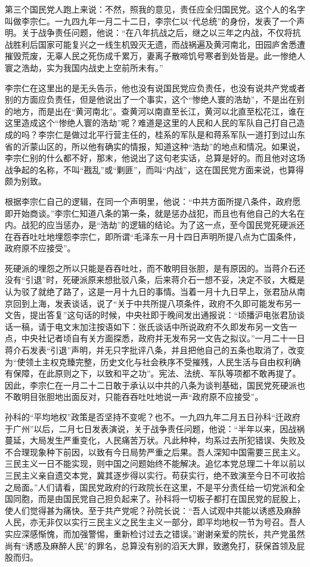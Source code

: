 第三个国民党人跑上来说：不然，照我的意见，责任应全归国民党。这个人的名字叫做李宗仁。一九四九年一月二十二日，李宗仁以“代总统”的身份，发表了一个声明。关于战争责任问题，他说：“在八年抗战之后，继之以三年之内战，不仅将抗战胜利后国家可能复兴之一线生机毁灭无遗，而战祸遍及黄河南北，田园庐舍悉遭摧毁荒废，无辜人民之死伤成千累万，妻离子散啼饥号寒者到处皆是。此一惨绝人寰之浩劫，实为我国内战史上空前所未有。”

李宗仁在这里出的是无头告示，他也没有说国民党应负责任，也没有说共产党或者别的方面应负责任，但是他说出了一个事实，这个“惨绝人寰的浩劫”，不是出在别的地方，而是出在“黄河南北”。查黄河以南直至长江，黄河以北直至松花江，谁在这里造成这个“惨绝人寰的浩劫”呢？难道是这里的人民和人民的军队自己打自己造成的吗？李宗仁是做过北平行营主任的，桂系的军队是和蒋系军队一道打到过山东省的沂蒙山区的，所以他有确实的情报，知道这种“浩劫”的地点和情况。如果说，李宗仁别的什么都不好，那末，他说出了这句老实话，总算是好的。而且他对这场战争起的名称，不叫“戡乱”或“剿匪”，而叫“内战”，这在国民党方面来说，也算得颇为别致。

根据李宗仁自己的逻辑，在同一个声明里，他说：“中共方面所提八条件，政府愿即开始商谈。”李宗仁知道八条的第一条，就是惩办战犯，而且也有他自己的大名在内。战犯的应当惩办，是“浩劫”的逻辑的结论。为了这一点，至今国民党死硬派还在吞吞吐吐地埋怨李宗仁，即所谓“毛泽东一月十四日声明所提八点为亡国条件，政府原不应接受”。

死硬派的埋怨之所以只能是吞吞吐吐，而不敢明目张胆，是有原因的。当蒋介石还没有“引退”时，死硬派原来想批驳八条，后来蒋介石一想不妥，决定不驳，大概是认为驳了就绝了路了，这是一月十九日的事情。当着一月十九日早上，张君劢从南京回到上海，发表谈话，说了“关于中共所提八项条件，政府不久即可能发布另一文告，提出答复”这句话的时候，中央社即于晚间发出通报说：“顷播沪电张君劢谈话一稿，请于电文末加注按语如下：张氏谈话中所说政府不久即发布另一文告一点，中央社记者顷自有关方面探悉，政府并无发布另一文告之拟议。”一月二十一日蒋介石发表“引退”声明，并无只字批评八条，并且把他自己的五条也取消了，改变为“使领土主权克臻完整，历史文化与社会秩序不受摧残，人民生活与自由权利确有保障，在此原则之下，以致和平之功”。宪法、法统、军队等项都不敢再提了。因此，李宗仁在一月二十二日敢于承认以中共的八条为谈判基础，国民党死硬派也不敢明目张胆地出面反对，只能吞吞吐吐地说一声“政府原不应接受”。

孙科的“平均地权”政策是否坚持不变呢？也不。一九四九年二月五日孙科“迁政府于广州”以后，二月七日发表演说，关于战争责任问题，他说：“半年以来，因战祸蔓延，大局发生严重变化，人民痛苦万状。凡此种种，均系过去所犯错误、失败及不合理现象种下前因，以致有今日局势严重之后果。吾人深知中国需要三民主义。三民主义一日不能实现，则中国之问题始终不能解决。追忆本党总理二十年以前以三民主义亲自遗交本党，冀其逐步得以实行。苟获实行，绝不致演至今日不可收拾之局面。”人们请看，国民党政府的行政院长在这里，不是平分责任给一切党派和全国同胞，而是由国民党自己担负起来了。孙科将一切板子都打在国民党的屁股上，使人们觉得甚为痛快。至于共产党呢？孙院长说：“吾人试观中共能以诱惑及麻醉人民，亦无非仅以实行三民主义之民生主义一部分，即平均地权一节为号召。吾人实应深感惭愧，而加强警惕，重新检讨过去之错误。”谢谢亲爱的院长，共产党虽然尚有“诱惑及麻醉人民”的罪名，总算没有别的滔天大罪，致邀免打，获保首领及屁股而归。

